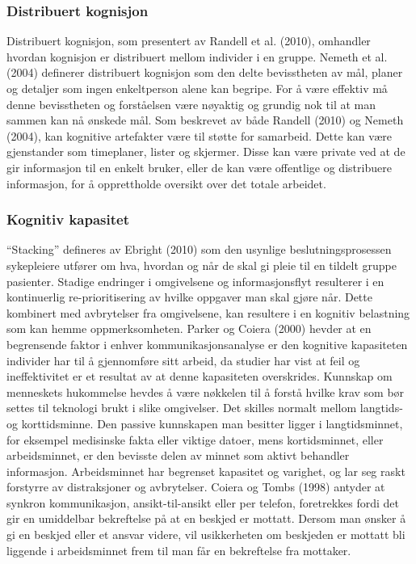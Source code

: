 \subsubsection{Distribuert kognisjon}
Distribuert kognisjon, som presentert av Randell et al. (2010), omhandler hvordan kognisjon er distribuert mellom individer i en gruppe. Nemeth et al. (2004) definerer distribuert kognisjon som den delte bevisstheten av mål, planer og detaljer som ingen enkeltperson alene kan begripe. For å være effektiv må denne bevisstheten og forståelsen være nøyaktig og grundig nok til at man sammen kan nå ønskede mål. Som beskrevet av både Randell (2010) og Nemeth (2004), kan kognitive artefakter være til støtte for samarbeid. Dette kan være gjenstander som timeplaner, lister og skjermer. Disse kan være private ved at de gir informasjon til en enkelt bruker, eller de kan være offentlige og distribuere informasjon, for å opprettholde oversikt over det totale arbeidet.

\subsubsection{Kognitiv kapasitet}
“Stacking” defineres av Ebright (2010) som den usynlige beslutningsprosessen sykepleiere utfører om hva, hvordan og når de skal gi pleie til en tildelt gruppe pasienter. Stadige endringer i omgivelsene og informasjonsflyt resulterer i en kontinuerlig re-prioritisering av hvilke oppgaver man skal gjøre når. Dette kombinert med avbrytelser fra omgivelsene, kan resultere i en kognitiv belastning som kan hemme oppmerksomheten. Parker og Coiera (2000) hevder at en begrensende faktor i enhver kommunikasjonsanalyse er den kognitive kapasiteten individer har til å gjennomføre sitt arbeid, da studier har vist at feil og ineffektivitet er et resultat av at denne kapasiteten overskrides. Kunnskap om menneskets hukommelse hevdes å være nøkkelen til å forstå hvilke krav som bør settes til teknologi brukt i slike omgivelser. Det skilles normalt mellom langtids- og korttidsminne. Den passive kunnskapen man besitter ligger i langtidsminnet, for eksempel medisinske fakta eller viktige datoer, mens kortidsminnet, eller arbeidsminnet, er den bevisste delen av minnet som aktivt behandler informasjon. Arbeidsminnet har begrenset kapasitet og varighet, og lar seg raskt forstyrre av distraksjoner og avbrytelser. Coiera og Tombs (1998) \nocite{Coiera98} antyder at synkron kommunikasjon, ansikt-til-ansikt eller per telefon, foretrekkes fordi det gir en umiddelbar bekreftelse på at en beskjed er mottatt. Dersom man ønsker å gi en beskjed eller et ansvar videre, vil usikkerheten om beskjeden er mottatt bli liggende i arbeidsminnet frem til man får en bekreftelse fra mottaker. 




